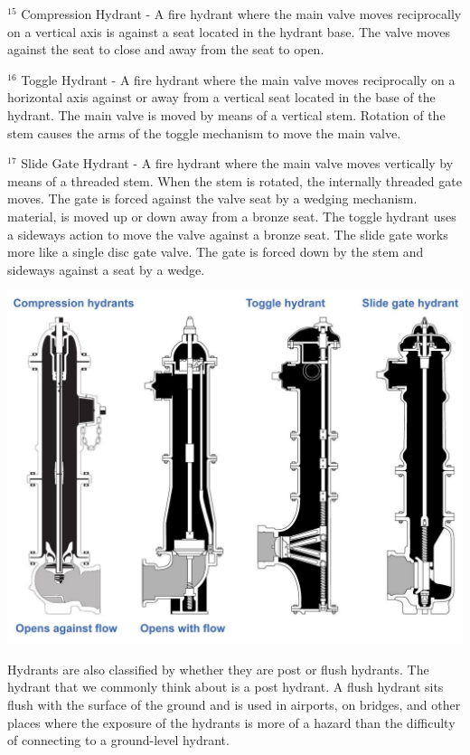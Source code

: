 \documentclass[10pt]{article}
\begin{document}
${ }^{15}$ Compression Hydrant - A fire hydrant where the main valve moves reciprocally on a vertical axis is against a seat located in the hydrant base. The valve moves against the seat to close and away from the seat to open.

${ }^{16}$ Toggle Hydrant - A fire hydrant where the main valve moves reciprocally on a horizontal axis against or away from a vertical seat located in the base of the hydrant. The main valve is moved by means of a vertical stem. Rotation of the stem causes the arms of the toggle mechanism to move the main valve.

${ }^{17}$ Slide Gate Hydrant - A fire hydrant where the main valve moves vertically by means of a threaded stem. When the stem is rotated, the internally threaded gate moves. The gate is forced against the valve seat by a wedging mechanism. material, is moved up or down away from a bronze seat. The toggle hydrant uses a sideways action to move the valve against a bronze seat. The slide gate works more like a single disc gate valve. The gate is forced down by the stem and sideways against a seat by a wedge.

\includegraphics[max width=\textwidth]{OtherDryBarrellFireHydrant}

Hydrants are also classified by whether they are post or flush hydrants. The hydrant that we commonly think about is a post hydrant. A flush hydrant sits flush with the surface of the ground and is used in airports, on bridges, and other places where the exposure of the hydrants is more of a hazard than the difficulty of connecting to a ground-level hydrant.
\end{document}
